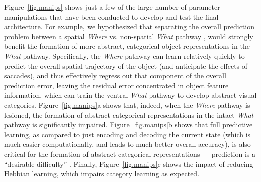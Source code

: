 \documentclass[12pt,twoside]{article}
\newif\myifpdf
\begin{document}
Figure~\ref{fig.manips} shows just a few of the large number of parameter manipulations that have been conducted to develop and test the final architecture.  For example, we hypothesized that separating the overall prediction problem between a spatial {\em Where} vs. non-spatial {\em What} pathway \cite{UngerleiderMishkin82,GoodaleMilner92}, would strongly benefit the formation of more abstract, categorical object representations in the {\em What} pathway.  Specifically, the {\em Where} pathway can learn relatively quickly to predict the overall spatial trajectory of the object (and anticipate the effects of saccades), and thus effectively regress out that component of the overall prediction error, leaving the residual error concentrated in object feature information, which can train the ventral {\em What} pathway to develop abstract visual categories.  Figure~\ref{fig.manips}a shows that, indeed, when the {\em Where} pathway is lesioned, the formation of abstract categorical representations in the intact {\em What} pathway is significantly impaired.  Figure~\ref{fig.manips}b shows that full predictive learning, as compared to just encoding and decoding the current state (which is much easier computationally, and leads to much better overall accuracy), is also critical for the formation of abstract categorical representations --- prediction is a ``desirable difficulty'' \cite{Bjork94}.  Finally, Figure~\ref{fig.manips}c shows the impact of reducing Hebbian learning, which impairs category learning as expected.
\end{document}
